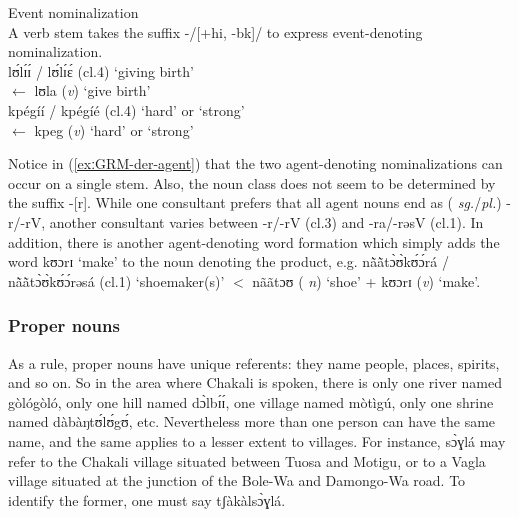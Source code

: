 \begin{exe}
\begin{exe}
\begin{exe}
{\begin{exe}
\begin{exe}
\begin{exe}
\begin{exe}
\z 
 \z


\begin{exe}
 \ex\label{exːGRM-der-action}{\rm Event nominalization}\\
{\rm A verb stem takes the suffix -/[{\sc +hi, -bk}]/   to express
event-denoting
nominalization.}\\
{\sls lʊ́lɪ́ɪ́ } / {\sls  lʊ́lɪ́ɛ́} ({\sc cl.4})  {\rm `giving birth'} \\
 $\leftarrow$ {\sls  lʊla} ({\it v})  {\rm `give birth' } \\
{\sls kpégíí} / {\sls   kpégíé}  ({\sc cl.4})  {\rm  `hard'  or
`strong'} \\
  $\leftarrow$ {\sls  kpeg} ({\it v})  {\rm `hard' or `strong'} \\

\z


Notice in (\ref{exːGRM-der-agent}) that the two
agent-denoting nominalizations can occur on a single stem. Also, the
noun class does not seem to be  determined by the suffix
-[r].  While one consultant prefers that all agent nouns end as ({\it
sg.}/{\it pl.}) {\sls -r/-rV}, another consultant varies between {\sls -r/-rV} 
({\sc cl.3}) and  {\sls -ra/-rəsV} ({\sc cl.1}).  In addition, there is another
agent-denoting word formation which simply adds the word {\sls kʊɔrɪ} `make' to
the noun denoting the product, e.g. {\sls nã̀ã̀tɔ̀ʊ̀kʊ́ɔ́rá} / {\sls 
nã̀ã̀tɔ̀ʊ̀kʊ́ɔ́rəsá} ({\sc cl.1}) `shoemaker(s)' $<$ {\sls nããtɔʊ} ({\it 
n})
`shoe' + {\sls kʊɔrɪ} ({\it v}) `make'.


\subsubsection{Proper nouns}
\label{sec:GRM-prop-noun}

% 


As a rule,   proper nouns
have  unique referents:  they  name people, places, spirits, and so on.  So in
the
area where Chakali is spoken, there is only one river named {\sls gòlógòló}, 
only
one hill named {\sls dɔ̀lbɪ́ɪ́}, one
village
named {\sls mòtìgú},  only one shrine named {\sls dàbàŋtʊ́lʊ́gʊ́}, etc.  
Nevertheless more than one person can have the same
name, and the same applies to a lesser extent to villages. For instance,
{\sls sɔ̀ɣlá} may refer to the Chakali village situated between Tuosa and 
Motigu, 
or to
a Vagla village situated at the junction of the Bole-Wa and Damongo-Wa road. To
identify the former, one must say {\sls tʃàkàlsɔ̀ɣlá}. 



\end{exe}
\end{exe}
\end{exe}
\end{exe}
\end{exe}}
\end{exe}
\end{exe}
\end{exe}
